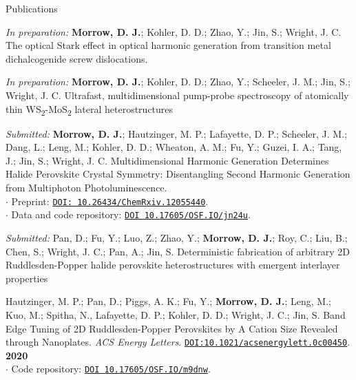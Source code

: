 \documentclass{resume} %
\begin{document}
\begin{rSection}{Publications}
	
\begin{etaremune}
	
\item[] \textit{In preparation:} \textbf{Morrow, D. J.}; Kohler, D. D.; Zhao, Y.; Jin, S.; Wright, J. C.	The optical Stark effect in optical harmonic generation from transition metal dichalcogenide screw dislocations.
	
\item[] \textit{In preparation:} \textbf{Morrow, D. J.}; Kohler, D. D.; Zhao, Y.; Scheeler, J. M.; Jin, S.; Wright, J. C. Ultrafast, multidimensional pump-probe spectroscopy of atomically thin WS\textsubscript{2}-MoS\textsubscript{2} lateral heterostructures
	

\item[] \textit{Submitted:} \textbf{Morrow, D. J.}; Hautzinger, M. P.; Lafayette, D. P.; Scheeler, J. M.; Dang, L.; Leng, M.; Kohler, D. D.; Wheaton, A. M.; Fu, Y.; Guzei, I. A.; Tang, J.; Jin, S.; Wright, J. C. Multidimensional Harmonic Generation Determines Halide Perovskite Crystal Symmetry: Disentangling Second Harmonic Generation from Multiphoton Photoluminescence.\\
$\cdot$ Preprint: \href{https://dx.doi.org/10.26434/chemrxiv.12055440}{\texttt{DOI: 10.26434/ChemRxiv.12055440}}. \\
$\cdot$ Data and code repository: \href{https://osf.io/jn24u/}{\texttt{DOI 10.17605/OSF.IO/jn24u}}.


\item[] \textit{Submitted:} Pan, D.; Fu, Y.; Luo, Z.; Zhao, Y.; \textbf{Morrow, D. J.}; Roy, C.; Liu, B.; Chen, S.; Wright, J. C.; Pan, A.; Jin, S. Deterministic fabrication of arbitrary 2D Ruddlesden-Popper halide perovskite heterostructures with emergent interlayer properties

\item Hautzinger, M. P.; Pan, D.; Piggs, A. K.; Fu, Y.; \textbf{Morrow, D. J.}; Leng, M.; Kuo, M.; Spitha, N., Lafayette, D. P.; Kohler, D. D.; Wright, J. C.; Jin, S. Band Edge Tuning of 2D Ruddlesden-Popper Perovskites by A Cation Size Revealed through Nanoplates. \emph{ACS Energy Letters}. \href{https://pubs.acs.org/doi/10.1021/acsenergylett.0c00450}{\texttt{DOI:10.1021/acsenergylett.0c00450}}. \textbf{2020} \\
$\cdot$ Code repository: \href{https://osf.io/m9dnw/}{\texttt{DOI 10.17605/OSF.IO/m9dnw}}.


\end{etaremune}
\end{rSection}
\end{document}
